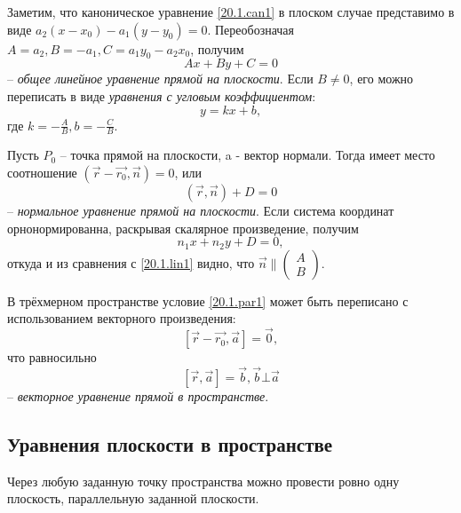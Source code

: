   Заметим, что каноническое уравнение \ref{20.1.can1} в плоском случае представимо в виде $a_2(x-x_0)-a_1(y-y_0)=0$. Переобозначая $A=a_2, B=-a_1, C=a_1y_0-a_2x_0$, получим
  \begin{equation}\label{20.1.lin1}
  Ax+By+C=0
  \end{equation}
  -- \textit{общее линейное уравнение прямой на плоскости}. Если $B\neq0$, его можно переписать в виде \textit{уравнения с угловым коэффициентом}:
  \begin{equation}\label{20.1.ang1}
  y=kx+b,
  \end{equation}
  где $k=-\frac AB, b=-\frac CB$.
    
  Пусть $P_0$ -- точка прямой на плоскости, a  - вектор нормали. Тогда имеет место соотношение $(\overrightarrow{r}-\overrightarrow{r_0},\overrightarrow{n})=0$, или
  \begin{equation}\label{20.1.norm1}
  (\overrightarrow{r},\overrightarrow{n})+D=0
  \end{equation}
  -- \textit{нормальное уравнение прямой на плоскости}. Если система координат орнонормированна, раскрывая скалярное произведение, получим
  \begin{equation}
  n_1x+n_2y+D=0,
  \end{equation}
откуда и из сравнения с \ref{20.1.lin1} видно, что $\overrightarrow{n}\parallel\left(\begin{array}{crl}
A\\
B
\end{array}\right)$.   

  В трёхмерном пространстве условие \ref{20.1.par1} может быть переписано с использованием векторного произведения:
  \begin{equation}\label{20.1.vect1}
  [\overrightarrow{r}-\overrightarrow{r_0},\overrightarrow{a}]=\overrightarrow{0}, 
  \end{equation}
  что равносильно
  \begin{equation}\label{20.1.vect2}
  [\overrightarrow{r},\overrightarrow{a}]=\overrightarrow{b}, \overrightarrow{b}\bot\overrightarrow{a}
  \end{equation}
  -- \textit{векторное уравнение прямой в пространстве}.
  
\subsection{Уравнения плоскости в пространстве}
\begin{axiome}
Через любую заданную точку пространства можно провести ровно одну плоскость, параллельную заданной плоскости.
\end{axiome}

